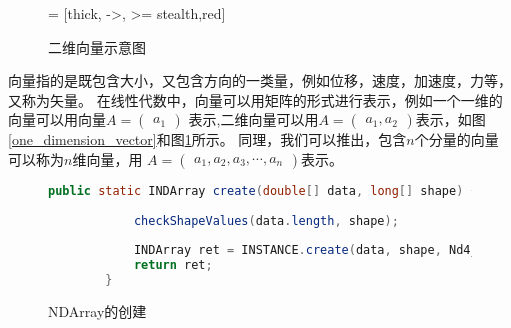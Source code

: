 \begin{figure}
	\centering
	 = [thick, ->, >= stealth,red]
	\begin{minipage}[c]{0.5\textwidth}
	\centering
			\caption{一维向量示意图}
			\label{one_dimension_vector}
	\end{minipage}%
	\begin{minipage}[c]{0.5\textwidth}
	\centering
			\caption{二维向量示意图}
			\label{two_dimension_vector}
	\end{minipage}
	\end{figure}

向量指的是既包含大小，又包含方向的一类量，例如位移，速度，加速度，力等，又称为矢量。
在线性代数中，向量可以用矩阵的形式进行表示，例如一个一维的向量可以用向量$A=\left( \begin{array}{ccc}{a_{1}}\end{array}\right)$
表示,二维向量可以用$A=\left( \begin{array}{ccc}{a_{1},a_{2}}\end{array}\right)$表示，如图\ref{one_dimension_vector}和图\ref{two_dimension_vector}所示。
同理，我们可以推出，包含$n$个分量的向量可以称为$n$维向量，用
$A=\left( \begin{array}{ccc}{a_{1},a_{2},a_{3},\cdots,a_{n}}\end{array}\right)$表示。

\begin{figure}[!b]
	\begin{lstlisting}[language=Java]
		public static INDArray create(double[] data, long[] shape) {
	
			checkShapeValues(data.length, shape);
	
			INDArray ret = INSTANCE.create(data, shape, Nd4j.getStrides(shape, Nd4j.order()), DataType.DOUBLE, Nd4j.getMemoryManager().getCurrentWorkspace());
			return ret;
		}
	\end{lstlisting}
	\caption{NDArray的创建}
	\label{NDArray_creation}
\end{figure}


